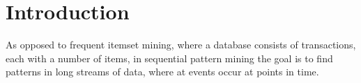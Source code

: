 \section{Introduction}

As opposed to frequent itemset mining, where a database consists of transactions, each with a number of items, in sequential pattern mining the goal is to find patterns in long streams of data, where at events occur at points in time.
